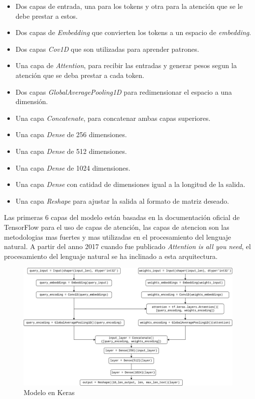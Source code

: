 \begin{itemize}
    \item Dos capas de entrada, una para los tokens y otra para la atención que se le debe prestar a estos.
    \item Dos capas de \textit{Embedding} que convierten los tokens a un espacio de \textit{embedding}.
    \item Dos capas \textit{Cov1D} que son utilizadas para aprender patrones.
    \item Una capa de \textit{Attention}, para recibir las entradas y generar pesos segun la atenci\'on que se deba prestar a cada token.
    \item Dos capas \textit{GlobalAveragePooling1D} para redimensionar el espacio a una dimensión.
    \item Una capa \textit{Concatenate}, para concatenar ambas capas superiores.
    \item Una capa \textit{Dense} de 256 dimensiones.
    \item Una capa \textit{Dense} de 512 dimensiones.
    \item Una capa \textit{Dense} de 1024 dimensiones.
    \item Una capa \textit{Dense} con catidad de dimensiones igual a la longitud de la salida.
    \item Una capa \textit{Reshape} para ajustar la salida al formato de matriz deseado.
\end{itemize}
Las primeras 6 capas del modelo están basadas en la documentación oficial de TensorFlow para el uso de capas de atención, las capas de atencion son las metodologias mas fuertes y mas utilizadas en el procesamiento del lenguaje natural. A partir del anno 2017 cuando fue publicado \textit{Attention is all you need}, el procesamiento del lenguaje natural se ha inclinado a esta arquitectura.

\begin{figure}[H]
\centering
 \includegraphics[width=\textwidth]{Graphics/model.png}
 \caption{Modelo en Keras}
 \label{fig:modelo}
\end{figure}

